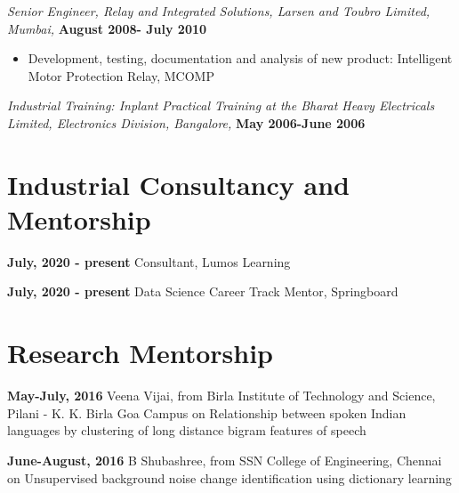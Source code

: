 \documentclass[line]{resume}
\begin{document}
{\begin{resume}
\begin{list2}
\begin{itemize}
			\end{itemize}
			
			\item \emph{Senior Engineer, Relay and Integrated
				Solutions, Larsen and Toubro Limited, Mumbai,} \hfill
			\textbf{August 2008- July 2010} 
			\begin{itemize}
				\item
				Development, testing, documentation and analysis of new product: Intelligent Motor Protection Relay, MCOMP 

				
			\end{itemize}
			
			
			
			
			\item
			\emph{Industrial Training:
				Inplant Practical Training at the Bharat Heavy
				Electricals Limited, Electronics Division, Bangalore,}
		\hfill	\textbf{May 2006-June 2006}
		\end{list2}
		
				\section{\mysidestyle Industrial Consultancy and Mentorship}
		\vspace{1mm}
		\noindent	\textbf{ July, 2020 - present} Consultant, Lumos Learning
		\vspace{-3mm}
		
			\textbf{ July, 2020 - present}  Data Science Career Track Mentor, Springboard
			
			
			\section{\mysidestyle Research Mentorship}
			\vspace{1mm}
		\noindent	\textbf{ May-July, 2016}  Veena Vijai, from Birla Institute of Technology and Science, Pilani - K. K. Birla Goa Campus  on Relationship between spoken Indian languages by clustering of long distance bigram features of speech	
				\vspace{-3mm}
				
			\textbf{ June-August, 2016} B Shubashree, from SSN College of Engineering, Chennai on Unsupervised background noise change identification using dictionary learning
			\vspace{-1.5mm}
			

\end{resume}}
\end{document}
